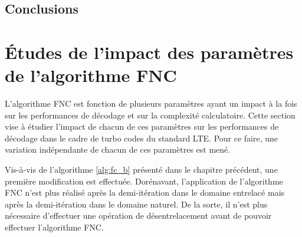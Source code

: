 \subsection{Conclusions}
\begin{table}[b]
\centering
\caption{TITRE}
\label{tab:compa}
\end{table}


\newpage
\section{Études de l'impact des paramètres de l'algorithme FNC}
L'algorithme FNC est fonction de plusieurs paramètres ayant un impact à la fois sur les performances de décodage et sur
la complexité calculatoire. Cette section vise à étudier l'impact de chacun de ces paramètres sur les performances de 
décodage dans le cadre de turbo codes du standard LTE. Pour ce faire, une variation indépendante de chacun de ces 
paramètres est mené.

Vis-à-vis de l'algorithme \ref{alg:fc_b} présenté dans le chapitre précédent, une première modification est effectuée. 
Dorénavant, l'application de l'algorithme FNC n'est plus réalisé après la demi-itération dans le domaine
entrelacé mais après la demi-itération dans le domaine naturel. De la sorte, il n'est plus nécessaire d'effectuer une 
opération de désentrelacement avant de pouvoir effectuer l'algorithme FNC.


